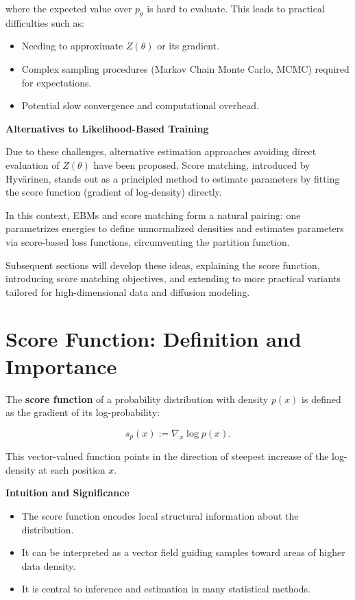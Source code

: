 where the expected value over \( p_\theta \) is hard to evaluate. This leads to practical difficulties such as:

\begin{itemize}
    \item Needing to approximate \( Z(\theta) \) or its gradient.
    \item Complex sampling procedures (Markov Chain Monte Carlo, MCMC) required for expectations.
    \item Potential slow convergence and computational overhead.
\end{itemize}

\textbf{Alternatives to Likelihood-Based Training}

Due to these challenges, alternative estimation approaches avoiding direct evaluation of \( Z(\theta) \) have been proposed. Score matching, introduced by Hyvärinen, stands out as a principled method to estimate parameters by fitting the score function (gradient of log-density) directly.

In this context, EBMs and score matching form a natural pairing: one parametrizes energies to define unnormalized densities and estimates parameters via score-based loss functions, circumventing the partition function.

Subsequent sections will develop these ideas, explaining the score function, introducing score matching objectives, and extending to more practical variants tailored for high-dimensional data and diffusion modeling.

\section{Score Function: Definition and Importance}

The \textbf{score function} of a probability distribution with density \( p(x) \) is defined as the gradient of its log-probability:

\[
s_p(x) := \nabla_x \log p(x).
\]

This vector-valued function points in the direction of steepest increase of the log-density at each position \( x \).

\textbf{Intuition and Significance}

\begin{itemize}
    \item The score function encodes local structural information about the distribution.
    \item It can be interpreted as a vector field guiding samples toward areas of higher data density.
    \item It is central to inference and estimation in many statistical methods.
\end{itemize}

